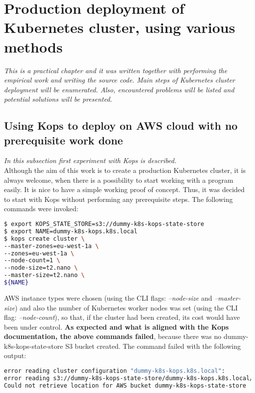 \section{Production deployment of Kubernetes cluster, using various methods}
\textit{This is a practical chapter and it was written together with performing the empirical work and writing the source code. Main steps of Kubernetes cluster deployment will be enumerated. Also, encountered problems will be listed and potential solutions will be presented.}
\\

\subsection{Using Kops to deploy on AWS cloud with no prerequisite work done}
\textit{In this subsection first experiment with Kops is described.}
\\

Although the aim of this work is to create a production Kubernetes cluster, it is always welcome, when there is a possibility to start working with a program easily. It is nice to have a simple working proof of concept. Thus, it was decided to start with Kops without performing any prerequisite steps. The following commands were invoked:
\begin{lstlisting}[basicstyle=\small,caption={Commands used to create a cluster with kops, without prerequisite steps performed},captionpos=b,language=Bash,xleftmargin=1cm]
$ export KOPS_STATE_STORE=s3://dummy-k8s-kops-state-store
$ export NAME=dummy-k8s-kops.k8s.local
$ kops create cluster \
--master-zones=eu-west-1a \
--zones=eu-west-1a \
--node-count=1 \
--node-size=t2.nano \
--master-size=t2.nano \
${NAME}
\end{lstlisting}

AWS instance types were chosen (using the CLI flags: \textit{--node-size} and \textit{--master-size}) and also the number of Kubernetes worker nodes was set (using the CLI flag: \textit{--node-count}), so that, if the cluster had been created, its cost would have been under control. \textbf{As expected and what is aligned with the Kops documentation\cite{online-kops-aws}, the above commands failed}, because there was no dummy-k8s-kops-state-store S3 bucket created. The command failed with the following output:
\begin{lstlisting}[basicstyle=\small,caption={Output of the commands used to create a cluster with Kops, without prerequisite steps performed},captionpos=b,language=Bash,xleftmargin=1cm]
error reading cluster configuration "dummy-k8s-kops.k8s.local":
error reading s3://dummy-k8s-kops-state-store/dummy-k8s-kops.k8s.local/config:
Could not retrieve location for AWS bucket dummy-k8s-kops-state-store
\end{lstlisting}


